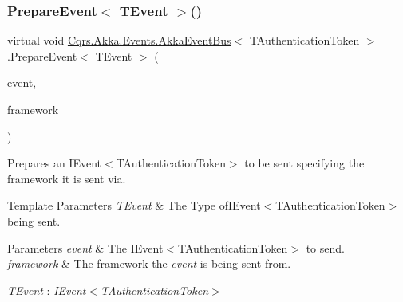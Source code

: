 \subsubsection{\texorpdfstring{Prepare\+Event$<$ T\+Event $>$()}{PrepareEvent< TEvent >()}}
{\footnotesize\ttfamily virtual void \hyperlink{classCqrs_1_1Akka_1_1Events_1_1AkkaEventBus}{Cqrs.\+Akka.\+Events.\+Akka\+Event\+Bus}$<$ T\+Authentication\+Token $>$.Prepare\+Event$<$ T\+Event $>$ (\begin{DoxyParamCaption}\item[{T\+Event @}]{event,  }\item[{string}]{framework }\end{DoxyParamCaption})\hspace{0.3cm}{\ttfamily [virtual]}}



Prepares an I\+Event$<$\+T\+Authentication\+Token$>$ to be sent specifying the framework it is sent via. 


\begin{DoxyTemplParams}{Template Parameters}
{\em T\+Event} & The Type ofI\+Event$<$\+T\+Authentication\+Token$>$ being sent.\\
\hline
\end{DoxyTemplParams}

\begin{DoxyParams}{Parameters}
{\em event} & The I\+Event$<$\+T\+Authentication\+Token$>$ to send.\\
\hline
{\em framework} & The framework the {\itshape event}  is being sent from.\\
\hline
\end{DoxyParams}
\begin{Desc}
\item[Type Constraints]\begin{description}
\item[{\em T\+Event} : {\em I\+Event$<$T\+Authentication\+Token$>$}]\end{description}
\end{Desc}
\mbox{\label{classCqrs_1_1Akka_1_1Events_1_1AkkaEventBus_aaba5d37020e21d03cc2bbc3da14f45ea_aaba5d37020e21d03cc2bbc3da14f45ea}} 
